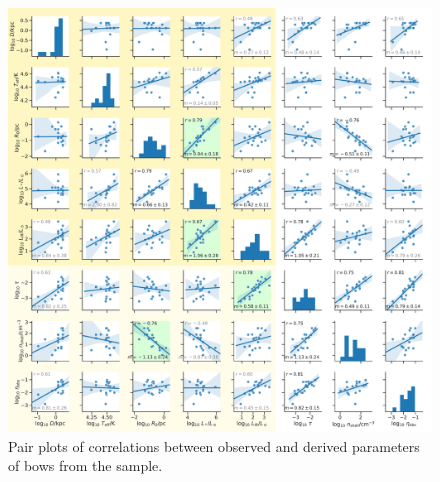 \begin{figure}
  \centering
  \includegraphics[width=\linewidth]{figs/K18-pairplot-edited}
  \caption[K18 pair plot]{Pair plots of correlations between observed
    and derived parameters of bows from the \citep{Kobulnicky:2018a}
    sample.}
  \label{fig:K18-pairplot-edited}
\end{figure}






